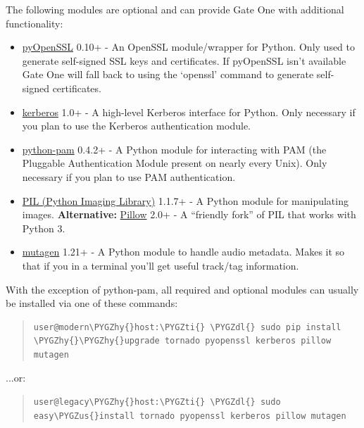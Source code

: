 \documentclass[letterpaper,10pt,openany]{sphinxmanual}
\def\PYGZus{\char`\_}
\def\PYGZdl{\char`\$}
\def\PYGZhy{\char`\-}
\def\PYGZti{\char`\~}
\begin{document}
The following modules are optional and can provide Gate One with additional
functionality:
\begin{itemize}
\item {} 
\href{https://launchpad.net/pyopenssl}{pyOpenSSL} 0.10+ - An OpenSSL module/wrapper for Python.  Only used to generate self-signed SSL keys and certificates.  If pyOpenSSL isn't available Gate One will fall back to using the `openssl' command to generate self-signed certificates.

\item {} 
\href{http://pypi.python.org/pypi/kerberos}{kerberos} 1.0+ - A high-level Kerberos interface for Python.  Only necessary if you plan to use the Kerberos authentication module.

\item {} 
\href{http://packages.debian.org/lenny/python-pam}{python-pam} 0.4.2+ - A Python module for interacting with PAM (the Pluggable Authentication Module present on nearly every Unix).  Only necessary if you plan to use PAM authentication.

\item {} 
\href{http://www.pythonware.com/products/pil/}{PIL (Python Imaging Library)} 1.1.7+ - A Python module for manipulating images.  \textbf{Alternative:} \href{https://github.com/python-imaging/Pillow}{Pillow} 2.0+ - A ``friendly fork'' of PIL that works with Python 3.

\item {} 
\href{https://code.google.com/p/mutagen/}{mutagen} 1.21+ - A Python module to handle audio metadata.  Makes it so that if you  in a terminal you'll get useful track/tag information.

\end{itemize}

With the exception of python-pam, all required and optional modules can usually be installed via one of these commands:
\begin{quote}

\begin{Verbatim}[commandchars=\\\{\}]
user@modern\PYGZhy{}host:\PYGZti{} \PYGZdl{} sudo pip install \PYGZhy{}\PYGZhy{}upgrade tornado pyopenssl kerberos pillow mutagen
\end{Verbatim}
\end{quote}

...or:
\begin{quote}

\begin{Verbatim}[commandchars=\\\{\}]
user@legacy\PYGZhy{}host:\PYGZti{} \PYGZdl{} sudo easy\PYGZus{}install tornado pyopenssl kerberos pillow mutagen
\end{Verbatim}
\end{quote}
\end{document}
